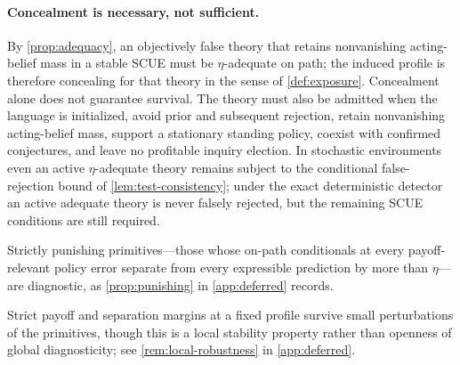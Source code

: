 \documentclass[11pt]{article}
\theoremstyle{definition}
\begin{document}
\paragraph{Concealment is necessary, not sufficient.}
By \cref{prop:adequacy}, an objectively false theory that retains nonvanishing acting-belief mass in a stable SCUE must be \(\eta\)-adequate on path; the induced profile is therefore concealing for that theory in the sense of \cref{def:exposure}.
Concealment alone does not guarantee survival.
The theory must also be admitted when the language is initialized, avoid prior and subsequent rejection, retain nonvanishing acting-belief mass, support a stationary standing policy, coexist with confirmed conjectures, and leave no profitable inquiry election.
In stochastic environments even an active \(\eta\)-adequate theory remains subject to the conditional false-rejection bound of \cref{lem:test-consistency}; under the exact deterministic detector an active adequate theory is never falsely rejected, but the remaining SCUE conditions are still required.

Strictly punishing primitives---those whose on-path conditionals at every payoff-relevant policy error separate from every expressible prediction by more than $\eta$---are diagnostic, as \cref{prop:punishing} in \cref{app:deferred} records.

Strict payoff and separation margins at a fixed profile survive small perturbations of the primitives, though this is a local stability property rather than openness of global diagnosticity; see \cref{rem:local-robustness} in \cref{app:deferred}.
\end{document}
